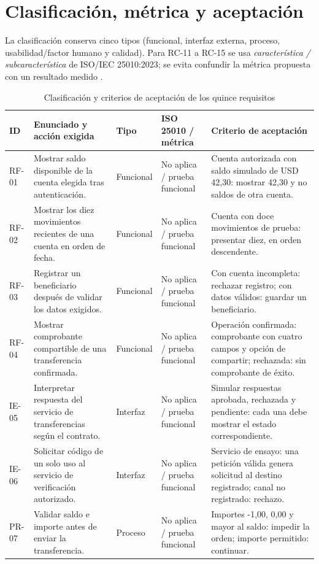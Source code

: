 \documentclass[conference,a4paper]{IEEEtran}
\begin{document}
\section{Clasificación, métrica y aceptación}\label{sec:tabla}
La clasificación conserva cinco tipos (funcional, interfaz externa, proceso, usabilidad/factor humano y calidad). Para RC-11 a RC-15 se usa \emph{característica / subcaracterística} de ISO/IEC 25010:2023; se evita confundir la métrica propuesta con un resultado medido \cite{iso25010}.
\begin{table}[!t]
\centering\caption{Clasificación y criterios de aceptación de los quince requisitos}
\fontsize{7.1}{8.3}\selectfont
\begin{tabularx}{\textwidth}{@{}p{0.75cm}p{4.0cm}p{1.55cm}p{3.4cm}Y@{}}
\toprule ID & Enunciado y acción exigida & Tipo & ISO 25010 / métrica & Criterio de aceptación \\
\midrule
RF-01 & Mostrar saldo disponible de la cuenta elegida tras autenticación. & Funcional & No aplica / prueba funcional & Cuenta autorizada con saldo simulado de USD 42,30: mostrar 42,30 y no saldos de otra cuenta. \\
RF-02 & Mostrar los diez movimientos recientes de una cuenta en orden de fecha. & Funcional & No aplica / prueba funcional & Cuenta con doce movimientos de prueba: presentar diez, en orden descendente. \\
RF-03 & Registrar un beneficiario después de validar los datos exigidos. & Funcional & No aplica / prueba funcional & Con cuenta incompleta: rechazar registro; con datos válidos: guardar un beneficiario. \\
RF-04 & Mostrar comprobante compartible de una transferencia confirmada. & Funcional & No aplica / prueba funcional & Operación confirmada: comprobante con cuatro campos y opción de compartir; rechazada: sin comprobante de éxito. \\
IE-05 & Interpretar respuesta del servicio de transferencias según el contrato. & Interfaz & No aplica / prueba funcional & Simular respuestas aprobada, rechazada y pendiente: cada una debe mostrar el estado correspondiente. \\
IE-06 & Solicitar código de un solo uso al servicio de verificación autorizado. & Interfaz & No aplica / prueba funcional & Servicio de ensayo: una petición válida genera solicitud al destino registrado; canal no registrado: rechazo. \\
PR-07 & Validar saldo e importe antes de enviar la transferencia. & Proceso & No aplica / prueba funcional & Importes -1,00, 0,00 y mayor al saldo: impedir la orden; importe permitido: continuar. \\

\end{tabularx}
\end{table}
\end{document}
